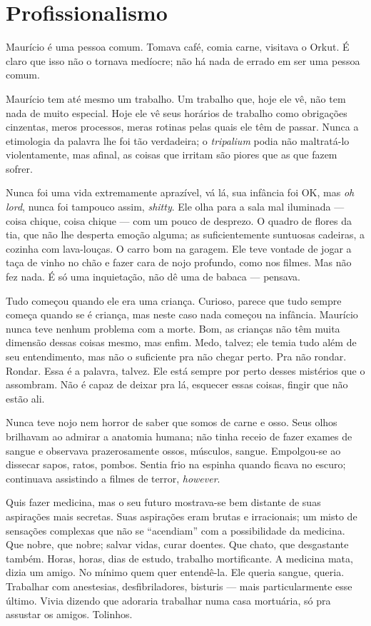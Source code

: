 \chapter{Profissionalismo}

Maurício é uma pessoa comum. Tomava café, comia carne, visitava o Orkut. É claro que isso não o tornava medíocre; não há nada de errado em ser uma pessoa comum.

Maurício tem até mesmo um trabalho. Um trabalho que, hoje ele vê, não tem nada de muito especial. Hoje ele vê seus horários de trabalho como obrigações cinzentas, meros processos, meras rotinas pelas quais ele têm de passar. Nunca a etimologia da palavra lhe foi tão verdadeira; o \emph{tripalium} podia não maltratá-lo violentamente, mas afinal, as coisas que irritam são piores que as que fazem sofrer.

Nunca foi uma vida extremamente aprazível, vá lá, sua infância foi OK, mas \emph{oh lord}, nunca foi tampouco assim, \foreignlanguage{english}{\emph{shitty}}. Ele olha para a sala mal iluminada --- coisa chique, coisa chique --- com um pouco de desprezo. O quadro de flores da tia, que não lhe desperta emoção alguma; as suficientemente suntuosas cadeiras, a cozinha com lava-louças. O carro bom na garagem. Ele teve vontade de jogar a taça de vinho no chão e fazer cara de nojo profundo, como nos filmes. Mas não fez nada. É só uma inquietação, não dê uma de babaca --- pensava.

Tudo começou quando ele era uma criança. Curioso, pa\-re\-ce que tudo sempre começa quando se é criança, mas neste caso nada começou na infância. Maurício nunca teve nenhum problema com a morte. Bom, as crianças não têm muita dimensão dessas coisas mesmo, mas enfim. Medo, talvez; ele temia tudo além de seu entendimento, mas não o suficiente pra não chegar perto. Pra não rondar. Rondar. Essa é a palavra, talvez. Ele está sempre por perto desses mistérios que o assombram. Não é capaz de deixar pra lá, esquecer essas coisas, fingir que não estão ali.

Nunca teve nojo nem horror de saber que somos de carne e osso. Seus olhos brilhavam ao admirar a anatomia humana; não tinha receio de fazer exames de sangue e observava prazerosamente ossos, músculos, sangue. Empolgou-se ao dissecar sapos, ratos, pombos. Sentia frio na espinha quando ficava no escuro; continuava assistindo a filmes de terror, \foreignlanguage{english}{\emph{however}}.

Quis fazer medicina, mas o seu futuro mostrava-se bem distante de suas aspirações mais secretas. Suas aspirações eram brutas e irracionais; um misto de sensações complexas que não se ``acendiam'' com a possibilidade da medicina. Que nobre, que nobre; salvar vidas, curar doentes. Que chato, que desgastante também. Horas, horas, dias de estudo, trabalho mortificante. A medicina mata, dizia um amigo. No mínimo quem quer entendê-la. Ele queria sangue, queria. Trabalhar com anestesias, desfibriladores, bisturis --- mais par\-ti\-cu\-lar\-men\-te esse último. Vivia dizendo que adoraria trabalhar numa casa mortuária, só pra assustar os amigos. Tolinhos.

